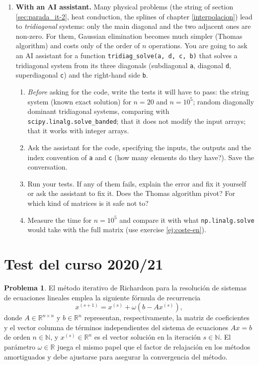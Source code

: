 \begin{enumerate}
\item \label{ej:thomas_ia-en} \textbf{With an AI assistant.} Many physical problems (the string of section \ref{sec:parada_it-2}, heat conduction, the splines of chapter \ref{interpolacion}) lead to \emph{tridiagonal} systems: only the main diagonal and the two adjacent ones are non-zero. For them, Gaussian elimination becomes much simpler (Thomas algorithm) and costs only of the order of $n$ operations. You are going to ask an AI assistant for a function \texttt{tridiag\_solve(a, d, c, b)} that solves a tridiagonal system from its three diagonals (subdiagonal \texttt{a}, diagonal \texttt{d}, superdiagonal \texttt{c}) and the right-hand side \texttt{b}.
\begin{enumerate}
\item \emph{Before} asking for the code, write the tests it will have to pass: the string system (known exact solution) for $n=20$ and $n=10^5$; random diagonally dominant tridiagonal systems, comparing with \texttt{scipy.linalg.solve\_banded}; that it does not modify the input arrays; that it works with integer arrays.
\item Ask the assistant for the code, specifying the inputs, the outputs and the index convention of \texttt{a} and \texttt{c} (how many elements do they have?). Save the conversation.
\item Run your tests. If any of them fails, explain the error and fix it yourself or ask the assistant to fix it. Does the Thomas algorithm pivot? For which kind of matrices is it safe not to?
\item Measure the time for $n=10^5$ and compare it with what \texttt{np.linalg.solve} would take with the full matrix (use exercise \ref{ej:coste-en}).
\end{enumerate}
\end{enumerate}

\section{Test del curso 2020/21}
\noindent \textbf{Problema 1}. El método iterativo de Richardson para la resolución de sistemas de ecuaciones lineales emplea la siguiente fórmula de recurrencia
\begin{equation}\label{eq:richardson}
x^{(s+1)} = x^{(s)} + \omega\left( b - Ax^{(s)}\right),
\end{equation}
donde $A \in \mathbb{R}^{n\times n}$ y $b  \in \mathbb{R}^{n}$ representan, respectivamente, la matriz de coeficientes y el vector columna de términos independientes del sistema de ecuaciones $Ax=b$ de orden $n\in\mathbb{N}$, y $x^{(s)}\in\mathbb{R}^n$ es el vector solución en la iteración $s\in\mathbb{N}$. El parámetro $\omega \in \mathbb{R}$ juega el mismo papel que el factor de relajación en los métodos amortiguados y debe ajustarse para asegurar la convergencia del método.

